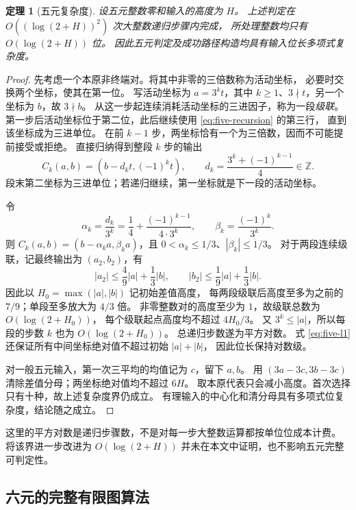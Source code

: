 \documentclass[UTF8,fontset=fandol,zihao=-4,a4paper]{ctexart}
\numberwithin{equation}{section}
\newtheorem{theorem}{定理}[section]
\theoremstyle{definition}
\newcommand{\Z}{\mathbb Z}
\begin{document}
\begin{theorem}[五元复杂度]\label{thm:five-complexity}
设五元整数零和输入的高度为 $H$。
上述判定在 $O((\log(2+H))^2)$ 次大整数递归步骤内完成，
所处理整数均只有 $O(\log(2+H))$ 位。
因此五元判定及成功路径构造均具有输入位长多项式复杂度。
\end{theorem}
\begin{proof}
先考虑一个本原非终端对。将其中非零的三倍数称为活动坐标，
必要时交换两个坐标，使其在第一位。
写活动坐标为 $a=3^kt$，其中 $k\ge1$、$3\nmid t$，另一个坐标为 $b$，故 $3\nmid b$。
从这一步起连续消耗活动坐标的三进因子，称为一段\emph{级联}。
第一步后活动坐标位于第二位，此后继续使用 \eqref{eq:five-recursion} 的第三行，
直到该坐标成为三进单位。
在前 $k-1$ 步，两坐标恰有一个为三倍数，因而不可能提前接受或拒绝。
直接归纳得到整段 $k$ 步的输出
\begin{equation}\label{eq:five-cascade}
 C_k(a,b)=\left(b-d_kt,(-1)^kt\right),\qquad
 d_k=\frac{3^k+(-1)^{k-1}}4\in\Z.
\end{equation}
段末第二坐标为三进单位；若递归继续，第一坐标就是下一段的活动坐标。

令
\[
 \alpha_k=\frac{d_k}{3^k}
 =\frac14+\frac{(-1)^{k-1}}{4\cdot3^k},\qquad
 \beta_k=\frac{(-1)^k}{3^k}.
\]
则 $C_k(a,b)=(b-\alpha_ka,\beta_ka)$，且
$0<\alpha_k\le1/3$、$|\beta_k|\le1/3$。
对于两段连续级联，记最终输出为 $(a_2,b_2)$，有
\begin{equation}\label{eq:five-contraction}
 |a_2|\le\frac49|a|+\frac13|b|,\qquad
 |b_2|\le\frac19|a|+\frac13|b|.
\end{equation}
因此以 $H_0=\max(|a|,|b|)$ 记初始差值高度，
每两段级联后高度至多为之前的 $7/9$；单段至多放大为 $4/3$ 倍。
非零整数对的高度至少为 $1$，故级联总数为 $O(\log(2+H_0))$，
每个级联起点高度均不超过 $4H_0/3$。
又 $3^k\le|a|$，所以每段的步数 $k$ 也为 $O(\log(2+H_0))$。
总递归步数遂为平方对数。
式 \eqref{eq:five-l1} 还保证所有中间坐标绝对值不超过初始 $|a|+|b|$，
因此位长保持对数级。

对一般五元输入，第一次三平均的均值记为 $c$，留下 $a,b$。
用 $(3a-3c,3b-3c)$ 清除差值分母；两坐标绝对值均不超过 $6H$。
取本原代表只会减小高度。首次选择只有十种，故上述复杂度界仍成立。
有理输入的中心化和清分母具有多项式位复杂度，结论随之成立。
\end{proof}

这里的平方对数是递归步骤数，不是对每一步大整数运算都按单位位成本计费。
将该界进一步改进为 $O(\log(2+H))$ 并未在本文中证明，也不影响五元完整可判定性。

\subsection{六元的完整有限图算法}
\end{document}
